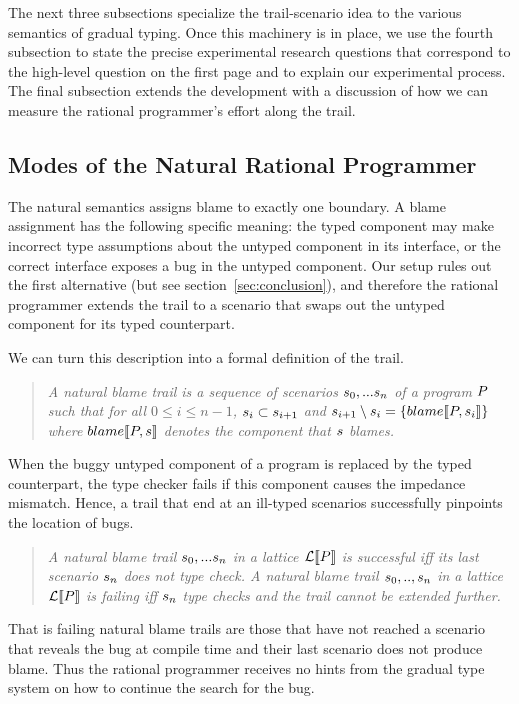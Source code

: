 
The next three subsections specialize the trail-scenario idea to the
various semantics of gradual typing. Once this machinery is in place,
we use the fourth subsection to state the precise experimental
research questions that correspond to the high-level question on the
first page and to explain our experimental process. The final
subsection extends the development with a discussion of how we can
measure the rational programmer's effort along the trail. 


\subsection{Modes of the Natural Rational Programmer} \label{sub:natural}

The natural semantics assigns blame to exactly one boundary.  A blame assignment
has the following specific meaning: the typed component may make incorrect type
assumptions about the untyped component in its interface, or the correct
interface exposes a bug in the untyped component. Our setup rules out the first
alternative (but see section~\ref{sec:conclusion}), and therefore the rational
programmer extends the trail to a scenario that swaps out the untyped component
for its typed counterpart.

We can turn this description into a formal definition of the trail. 
\begin{quote}
\it A \emph{natural blame trail} is a sequence of scenarios $s_0,...s_n$ of
a program $P$ such that for all $0 \leq i \leq n - 1$, $s_i \subset
s_{i+1}$ and $s_{i+1} \setminus s_i =\{blame\llbracket P, s_i\rrbracket\}$ where
$blame\llbracket P, s\rrbracket$ denotes the component that $s$ blames.
\end{quote}

When the buggy untyped component of a program is replaced by the typed counterpart,
the type checker fails if this component causes the impedance mismatch. Hence, a
trail that end at an ill-typed scenarios successfully pinpoints the location of
bugs. 
\begin{quote}
\it A natural blame trail $s_0,...s_n$ in a lattice $\mathcal{L}\llbracket P\rrbracket$ is
\emph{successful} iff its last scenario $s_n$ does not type check.  A natural
blame trail $s_0,..,s_n$ in a lattice $\mathcal{L}\llbracket P\rrbracket$ is \emph{failing}
iff $s_n$ type checks and the trail cannot be extended further.
\end{quote}
That is failing natural blame trails are those that have not reached a scenario that
reveals the bug at compile time and their last scenario does not produce blame. Thus
the rational programmer receives no hints from the gradual type system on how to
continue the search for the bug.

